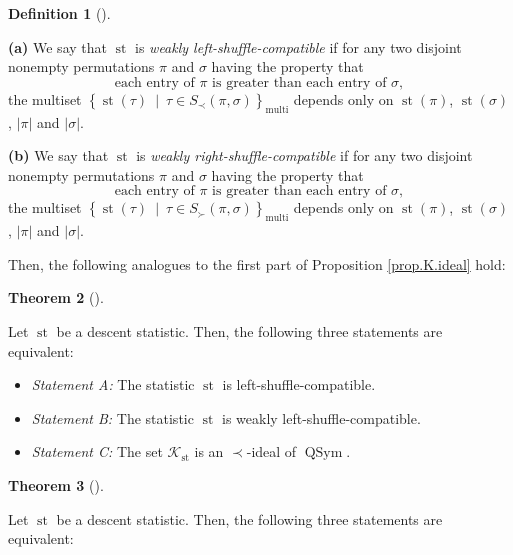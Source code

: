 \documentclass[numbers=enddot,12pt,final,onecolumn,notitlepage]{scrartcl}%
\theoremstyle{definition}
\newtheorem{theo}{Theorem}[section]
\newenvironment{theorem}[1][]
{\begin{theo}[#1]\begin{leftbar}}
{\end{leftbar}\end{theo}}
\newtheorem{defi}[theo]{Definition}
\newenvironment{definition}[1][]
{\begin{defi}[#1]\begin{leftbar}}
{\end{leftbar}\end{defi}}
\newenvironment{vershort}{}{}
\begin{document}
\begin{vershort}
\begin{definition}
\textbf{(a)} We say that $\operatorname*{st}$ is \textit{weakly
left-shuffle-compatible} if for any two disjoint nonempty permutations $\pi$
and $\sigma$ having the property that%
\[
\text{each entry of }\pi\text{ is greater than each entry of }\sigma,
\]
the multiset $\left\{  \operatorname*{st}\left(  \tau\right)  \ \mid\ \tau\in
S_{\prec}\left(  \pi,\sigma\right)  \right\}  _{\operatorname*{multi}}$
depends only on $\operatorname*{st}\left(  \pi\right)  $, $\operatorname*{st}%
\left(  \sigma\right)  $, $\left\vert \pi\right\vert $ and $\left\vert
\sigma\right\vert $.

\textbf{(b)} We say that $\operatorname*{st}$ is \textit{weakly
right-shuffle-compatible} if for any two disjoint nonempty permutations $\pi$
and $\sigma$ having the property that%
\[
\text{each entry of }\pi\text{ is greater than each entry of }\sigma,
\]
the multiset $\left\{  \operatorname*{st}\left(  \tau\right)  \ \mid\ \tau\in
S_{\succ}\left(  \pi,\sigma\right)  \right\}  _{\operatorname*{multi}}$
depends only on $\operatorname*{st}\left(  \pi\right)  $, $\operatorname*{st}%
\left(  \sigma\right)  $, $\left\vert \pi\right\vert $ and $\left\vert
\sigma\right\vert $.
\end{definition}

Then, the following analogues to the first part of Proposition
\ref{prop.K.ideal} hold:

\begin{theorem}
\label{thm.dendri.K.ideal}Let $\operatorname*{st}$ be a descent statistic.
Then, the following three statements are equivalent:

\begin{itemize}
\item \textit{Statement A:} The statistic $\operatorname*{st}$ is left-shuffle-compatible.

\item \textit{Statement B:} The statistic $\operatorname*{st}$ is weakly left-shuffle-compatible.

\item \textit{Statement C:} The set $\mathcal{K}_{\operatorname*{st}}$ is an
$\left.  \prec\right.  $-ideal of $\operatorname*{QSym}$.
\end{itemize}
\end{theorem}

\begin{theorem}
\label{thm.dendri.K.ideal-R}Let $\operatorname*{st}$ be a descent statistic.
Then, the following three statements are equivalent:


\end{theorem}
\end{vershort}
\end{document}
